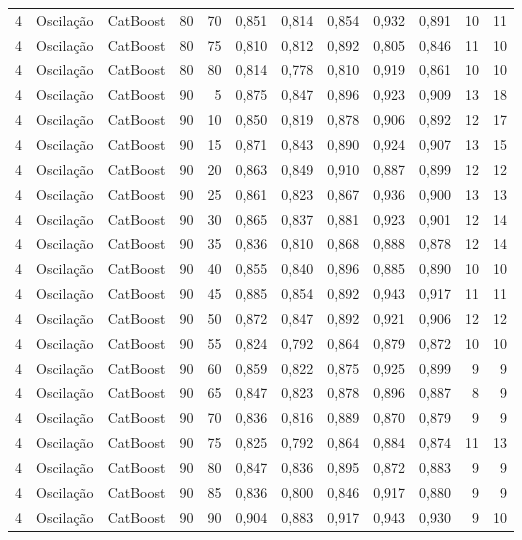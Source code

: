 \begin{longtable}{@{}rllrrrrrrrrr@{}}
4 & Oscilação & CatBoost & 80 & 70 & 0,851 & 0,814 & 0,854 & 0,932 & 0,891 & 10 & 11 \\
4 & Oscilação & CatBoost & 80 & 75 & 0,810 & 0,812 & 0,892 & 0,805 & 0,846 & 11 & 10 \\
4 & Oscilação & CatBoost & 80 & 80 & 0,814 & 0,778 & 0,810 & 0,919 & 0,861 & 10 & 10 \\
4 & Oscilação & CatBoost & 90 & 5 & 0,875 & 0,847 & 0,896 & 0,923 & 0,909 & 13 & 18 \\
4 & Oscilação & CatBoost & 90 & 10 & 0,850 & 0,819 & 0,878 & 0,906 & 0,892 & 12 & 17 \\
4 & Oscilação & CatBoost & 90 & 15 & 0,871 & 0,843 & 0,890 & 0,924 & 0,907 & 13 & 15 \\
4 & Oscilação & CatBoost & 90 & 20 & 0,863 & 0,849 & 0,910 & 0,887 & 0,899 & 12 & 12 \\
4 & Oscilação & CatBoost & 90 & 25 & 0,861 & 0,823 & 0,867 & 0,936 & 0,900 & 13 & 13 \\
4 & Oscilação & CatBoost & 90 & 30 & 0,865 & 0,837 & 0,881 & 0,923 & 0,901 & 12 & 14 \\
4 & Oscilação & CatBoost & 90 & 35 & 0,836 & 0,810 & 0,868 & 0,888 & 0,878 & 12 & 14 \\
4 & Oscilação & CatBoost & 90 & 40 & 0,855 & 0,840 & 0,896 & 0,885 & 0,890 & 10 & 10 \\
4 & Oscilação & CatBoost & 90 & 45 & 0,885 & 0,854 & 0,892 & 0,943 & 0,917 & 11 & 11 \\
4 & Oscilação & CatBoost & 90 & 50 & 0,872 & 0,847 & 0,892 & 0,921 & 0,906 & 12 & 12 \\
4 & Oscilação & CatBoost & 90 & 55 & 0,824 & 0,792 & 0,864 & 0,879 & 0,872 & 10 & 10 \\
4 & Oscilação & CatBoost & 90 & 60 & 0,859 & 0,822 & 0,875 & 0,925 & 0,899 & 9 & 9 \\
4 & Oscilação & CatBoost & 90 & 65 & 0,847 & 0,823 & 0,878 & 0,896 & 0,887 & 8 & 9 \\
4 & Oscilação & CatBoost & 90 & 70 & 0,836 & 0,816 & 0,889 & 0,870 & 0,879 & 9 & 9 \\
4 & Oscilação & CatBoost & 90 & 75 & 0,825 & 0,792 & 0,864 & 0,884 & 0,874 & 11 & 13 \\
4 & Oscilação & CatBoost & 90 & 80 & 0,847 & 0,836 & 0,895 & 0,872 & 0,883 & 9 & 9 \\
4 & Oscilação & CatBoost & 90 & 85 & 0,836 & 0,800 & 0,846 & 0,917 & 0,880 & 9 & 9 \\
4 & Oscilação & CatBoost & 90 & 90 & 0,904 & 0,883 & 0,917 & 0,943 & 0,930 & 9 & 10 \\

\end{longtable}
